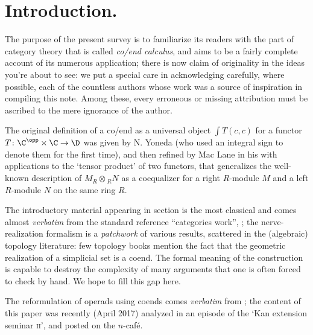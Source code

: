 \subjclass[2010]{}

\maketitle

{\small \tableofcontents}

\section*{Introduction.}
The purpose of the present survey is to familiarize its readers with the part of category theory that is called \emph{co/end calculus}, and aims to be a fairly complete account of its numerous application; there is now claim of originality in the ideas you're about to see: we put a special care in acknowledging carefully, where possible, each of the countless authors whose work was a source of inspiration in compiling this note. Among these, every erroneous or missing attribution must be ascribed to the mere ignorance of the author.

The original definition of a co/end as a universal object $\int T(c,c)$ for a functor $T\colon \C^\opp\times \C\to \D$ was given by N\@. Yoneda (who used an integral sign to denote them for the first time), and then refined by Mac Lane in his \cite{mac1970milgram} with applications to the `tensor product' of two functors, that generalizes the well-known description of $M_R\otimes {}_RN$ as a coequalizer for a right $R$\hyp{}module $M$ and a left $R$\hyp{}module $N$ on the same ring $R$. 

The introductory material appearing in section  is the most classical and comes almost \emph{verbatim} from the standard reference ``categories work'', \cite{McL}; the nerve\hyp{}realization formalism is a \emph{patchwork} of various results, scattered in the (algebraic) topology literature: few topology books mention the fact that the geometric realization of a simplicial set is a coend. The formal meaning of the construction is capable to destroy the complexity of many arguments that one is often forced to check by hand. We hope to fill this gap here.

The reformulation of operads using coends comes \emph{verbatim} from \cite{Kelly2005a}; the content of this paper was recently (April 2017) analyzed in an episode of the `Kan extension seminar \textsc{ii}', and posted on the $n$-café.

